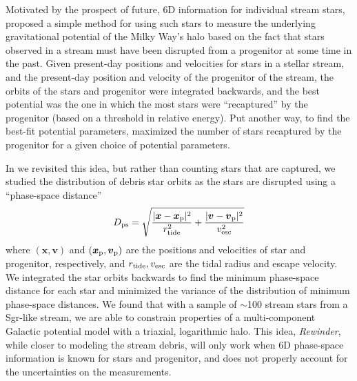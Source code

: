 \documentclass[letterpaper,12pt,preprint]{aastex}
\newcommand{\rewinder}{\emph{Rewinder}}
\begin{document}
Motivated by the prospect of future, 6D information for individual stream stars, \cite{johnston99a} proposed a simple method for using such stars to measure the underlying gravitational potential of the Milky Way's halo based on the fact that stars observed in a stream must have been disrupted from a progenitor at some time in the past. Given present-day positions and velocities for stars in a stellar stream, and the present-day position and velocity of the progenitor of the stream, the orbits of the stars and progenitor were integrated backwards, and the best potential was the one in which the most stars were ``recaptured'' by the progenitor (based on a threshold in relative energy). Put another way, to find the best-fit potential parameters, \cite{johnston99a} maximized the number of stars recaptured by the progenitor for a given choice of potential parameters.

In \cite{apw13} we revisited this idea, but rather than counting stars that are captured, we studied the distribution of debris star orbits as the stars are disrupted using a ``phase-space distance''
\begin{equation}
	D_{\rm ps} = \sqrt{\frac{\vert{\boldsymbol{x} - \boldsymbol{x}_{\rm p}\vert^2}}{r^2_{\rm tide}} + 
				    \frac{\vert{\boldsymbol{v} - \boldsymbol{v}_{\rm p}\vert^2}}{v^2_{\rm esc}}}
\end{equation}
where $(\boldsymbol{x},\boldsymbol{v})$ and $(\boldsymbol{x}_{\rm p},\boldsymbol{v}_{\rm p})$ are the positions and velocities of star and progenitor, respectively, and $r_{\rm tide}, v_{\rm esc}$ are the tidal radius and escape velocity. We integrated the star orbits backwards to find the minimum phase-space distance for each star and minimized the variance of the distribution of minimum phase-space distances. We found that with a sample of $\sim$100 stream stars from a Sgr-like stream, we are able to constrain properties of a multi-component Galactic potential model with a triaxial, logarithmic halo. This idea, \rewinder, while closer to modeling the stream debris, will only work when 6D phase-space information is known for stars and progenitor, and does not properly account for the uncertainties on the measurements.
\end{document}
